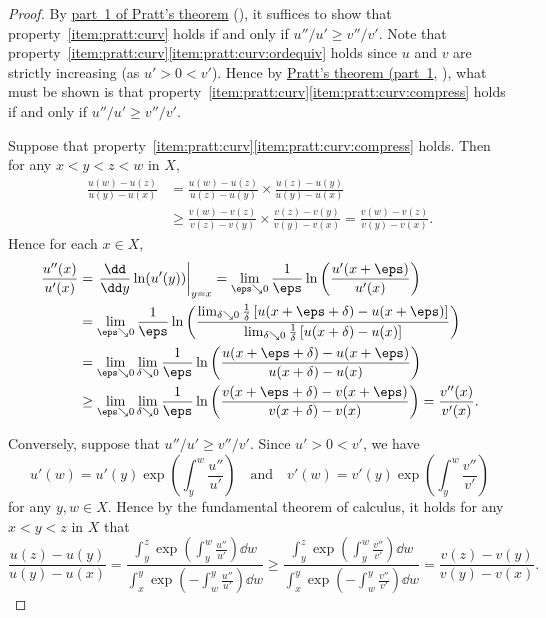 \begin{proof}
	By \hyperref[theorem:pratt]{part~1 of Pratt's theorem} (), it suffices to show that property~\ref{item:pratt:curv} holds if and only if $u''/u' \geq v''/v'$. Note that property~\ref{item:pratt:curv}\ref{item:pratt:curv:ordequiv} holds since $u$ and $v$ are strictly increasing (as $u' > 0 < v'$). Hence by \hyperref[theorem:pratt]{Pratt's theorem (part~1}, ), what must be shown is that property~\ref{item:pratt:curv}\ref{item:pratt:curv:compress} holds if and only if $u''/u' \geq v''/v'$.

	Suppose that property~\ref{item:pratt:curv}\ref{item:pratt:curv:compress} holds. Then for any $x<y<z<w$ in $X$,
	\begin{align*}
		\frac{u(w)-u(z)}{u(y)-u(x)}
		&= \frac{u(w)-u(z)}{u(z)-u(y)}
		\times \frac{u(z)-u(y)}{u(y)-u(x)}
		\\
		&\geq \frac{v(w)-v(z)}{v(z)-v(y)}
		\times \frac{v(z)-v(y)}{v(y)-v(x)}
		= \frac{v(w)-v(z)}{v(y)-v(x)} .
	\end{align*}
	Hence for each $x \in X$,
	\begin{align*}
		\frac{u''(x)}{u'(x)}
		&= \left. \frac{\dd}{\dd y} \ln( u'(y) ) \right|_{y=x}
		= \lim_{\eps \searrow 0} \frac{1}{\eps}
		\ln\left( \frac{u'(x+\eps)}{u'(x)} \right)
		\\
		&= \lim_{\eps \searrow 0}
		\frac{1}{\eps} \ln\left( \frac
		{ \lim_{\delta \searrow 0} \frac{1}{\delta}
		\left[ u(x+\eps+\delta) - u(x+\eps) \right] }
		{ \lim_{\delta \searrow 0} \frac{1}{\delta}
		\left[ u(x+\delta) - u(x) \right] }
		\right)
		\\
		&= \lim_{\eps \searrow 0}
		\lim_{\delta \searrow 0} 
		\frac{1}{\eps} \ln\left( \frac
		{ u(x+\eps+\delta) - u(x+\eps) }
		{ u(x+\delta) - u(x) }
		\right) 
		\\
		&\geq \lim_{\eps \searrow 0}
		\lim_{\delta \searrow 0} 
		\frac{1}{\eps} \ln\left( \frac
		{ v(x+\eps+\delta) - v(x+\eps) }
		{ v(x+\delta) - v(x) }
		\right)
		= \frac{v''(x)}{v'(x)} .
	\end{align*}

	Conversely, suppose that $u''/u' \geq v''/v'$. Since $u' > 0 < v'$, we have
	\begin{equation*}
		u'(w)
		= u'\left( y \right)
		\exp\left( \int_y^w \frac{u''}{u'} \right) 
		\quad \text{and} \quad
		v'(w)
		= v'\left( y \right)
		\exp\left( \int_y^w \frac{v''}{v'} \right) 
	\end{equation*}
	for any $y,w \in X$. Hence by the fundamental theorem of calculus, it holds for any $x<y<z$ in $X$ that
	\begin{equation*}
		\frac{ u(z) - u(y) }{ u(y) - u(x) }
		= \frac
		{ \int_y^z
		\exp\left( \int_y^w \frac{u''}{u'} \right)
		\dd w }
		{ \int_x^y
		\exp\left( - \int_w^y \frac{u''}{u'} \right)
		\dd w } 
		\geq \frac
		{ \int_y^z
		\exp\left( \int_y^w \frac{v''}{v'} \right)
		\dd w }
		{ \int_x^y
		\exp\left( - \int_w^y \frac{v''}{v'} \right)
		\dd w } 
		= \frac{ v(z) - v(y) }{ v(y) - v(x) } .
	\end{equation*}
\end{proof}


